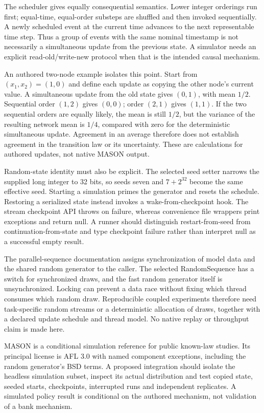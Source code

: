 The scheduler gives equally consequential semantics. Lower integer orderings run first; equal-time, equal-order substeps are shuffled and then invoked sequentially. A newly scheduled event at the current time advances to the next representable time step. Thus a group of events with the same nominal timestamp is not necessarily a simultaneous update from the previous state. A simulator needs an explicit read-old/write-new protocol when that is the intended causal mechanism.\citep{exec25_jnet_mason}

An authored two-node example isolates this point. Start from $(x_1,x_2)=(1,0)$ and define each update as copying the other node's current value. A simultaneous update from the old state gives $(0,1)$, with mean $1/2$. Sequential order $(1,2)$ gives $(0,0)$; order $(2,1)$ gives $(1,1)$. If the two sequential orders are equally likely, the mean is still $1/2$, but the variance of the resulting network mean is $1/4$, compared with zero for the deterministic simultaneous update. Agreement in an average therefore does not establish agreement in the transition law or its uncertainty. These are calculations for authored updates, not native MASON output.\citep{exec25_jnet_choice}

Random-state identity must also be explicit. The selected seed setter narrows the supplied long integer to 32 bits, so seeds seven and $7+2^{32}$ become the same effective seed. Starting a simulation primes the generator and resets the schedule. Restoring a serialized state instead invokes a wake-from-checkpoint hook. The stream checkpoint API throws on failure, whereas convenience file wrappers print exceptions and return null. A runner should distinguish restart-from-seed from continuation-from-state and type checkpoint failure rather than interpret null as a successful empty result.\citep{exec25_jnet_mason,exec25_jnet_choice}

The parallel-sequence documentation assigns synchronization of model data and the shared random generator to the caller. The selected RandomSequence has a switch for synchronized draws, and the fast random generator itself is unsynchronized. Locking can prevent a data race without fixing which thread consumes which random draw. Reproducible coupled experiments therefore need task-specific random streams or a deterministic allocation of draws, together with a declared update schedule and thread model. No native replay or throughput claim is made here.\citep{exec25_jnet_mason}

MASON is a conditional simulation reference for public known-law studies. Its principal license is AFL 3.0 with named component exceptions, including the random generator's BSD terms. A proposed integration should isolate the headless simulation subset, inspect its actual distribution and test copied state, seeded starts, checkpoints, interrupted runs and independent replicates. A simulated policy result is conditional on the authored mechanism, not validation of a bank mechanism.\citep{exec25_jnet_mason,exec25_jnet_choice}

